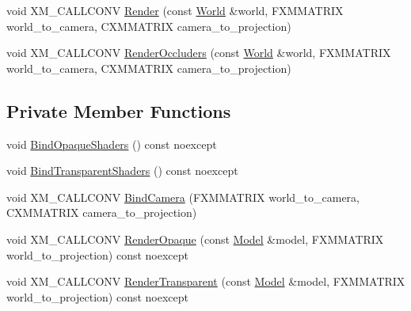 \begin{DoxyCompactItemize}
\item 
void X\+M\+\_\+\+C\+A\+L\+L\+C\+O\+NV \mbox{\hyperlink{classmage_1_1rendering_1_1_depth_pass_a8f7b040d49cb8b7a39ae28183073df0e}{Render}} (const \mbox{\hyperlink{classmage_1_1rendering_1_1_world}{World}} \&world, F\+X\+M\+M\+A\+T\+R\+IX world\+\_\+to\+\_\+camera, C\+X\+M\+M\+A\+T\+R\+IX camera\+\_\+to\+\_\+projection)
\item 
void X\+M\+\_\+\+C\+A\+L\+L\+C\+O\+NV \mbox{\hyperlink{classmage_1_1rendering_1_1_depth_pass_a8369c20dc33152471fa2bd5204a2615c}{Render\+Occluders}} (const \mbox{\hyperlink{classmage_1_1rendering_1_1_world}{World}} \&world, F\+X\+M\+M\+A\+T\+R\+IX world\+\_\+to\+\_\+camera, C\+X\+M\+M\+A\+T\+R\+IX camera\+\_\+to\+\_\+projection)
\end{DoxyCompactItemize}
\subsection*{Private Member Functions}
\begin{DoxyCompactItemize}
\item 
void \mbox{\hyperlink{classmage_1_1rendering_1_1_depth_pass_aeab0d647dbdc50233cfa4169282682fe}{Bind\+Opaque\+Shaders}} () const noexcept
\item 
void \mbox{\hyperlink{classmage_1_1rendering_1_1_depth_pass_a7c136dce9484e14b4a803f9ec84a10b8}{Bind\+Transparent\+Shaders}} () const noexcept
\item 
void X\+M\+\_\+\+C\+A\+L\+L\+C\+O\+NV \mbox{\hyperlink{classmage_1_1rendering_1_1_depth_pass_a507b99d81d657223bf5bebd5921496fb}{Bind\+Camera}} (F\+X\+M\+M\+A\+T\+R\+IX world\+\_\+to\+\_\+camera, C\+X\+M\+M\+A\+T\+R\+IX camera\+\_\+to\+\_\+projection)
\item 
void X\+M\+\_\+\+C\+A\+L\+L\+C\+O\+NV \mbox{\hyperlink{classmage_1_1rendering_1_1_depth_pass_a2a97b3566a4097d4213cfc8248ae9fd2}{Render\+Opaque}} (const \mbox{\hyperlink{classmage_1_1rendering_1_1_model}{Model}} \&model, F\+X\+M\+M\+A\+T\+R\+IX world\+\_\+to\+\_\+projection) const noexcept
\item 
void X\+M\+\_\+\+C\+A\+L\+L\+C\+O\+NV \mbox{\hyperlink{classmage_1_1rendering_1_1_depth_pass_aa6ead25e27049727933a900d2a82b132}{Render\+Transparent}} (const \mbox{\hyperlink{classmage_1_1rendering_1_1_model}{Model}} \&model, F\+X\+M\+M\+A\+T\+R\+IX world\+\_\+to\+\_\+projection) const noexcept
\end{DoxyCompactItemize}
